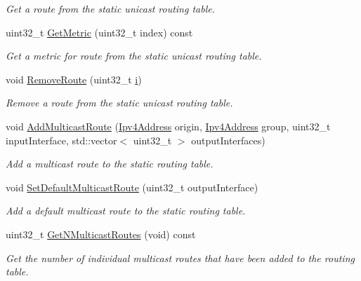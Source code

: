 \begin{DoxyCompactItemize}
\begin{DoxyCompactList}\small\item\em Get a route from the static unicast routing table. \end{DoxyCompactList}\item 
uint32\+\_\+t \hyperlink{classns3_1_1Ipv4StaticRouting_adae3d8690cec2cac5f5c4e2b239feb17}{Get\+Metric} (uint32\+\_\+t index) const 
\begin{DoxyCompactList}\small\item\em Get a metric for route from the static unicast routing table. \end{DoxyCompactList}\item 
void \hyperlink{classns3_1_1Ipv4StaticRouting_a2814791ae24de098c228d8ec64278444}{Remove\+Route} (uint32\+\_\+t \hyperlink{lte__uplink__power__control_8m_a6f6ccfcf58b31cb6412107d9d5281426}{i})
\begin{DoxyCompactList}\small\item\em Remove a route from the static unicast routing table. \end{DoxyCompactList}\item 
void \hyperlink{classns3_1_1Ipv4StaticRouting_a58582a0b87b6705d3c974146a19e25b9}{Add\+Multicast\+Route} (\hyperlink{classns3_1_1Ipv4Address}{Ipv4\+Address} origin, \hyperlink{classns3_1_1Ipv4Address}{Ipv4\+Address} group, uint32\+\_\+t input\+Interface, std\+::vector$<$ uint32\+\_\+t $>$ output\+Interfaces)
\begin{DoxyCompactList}\small\item\em Add a multicast route to the static routing table. \end{DoxyCompactList}\item 
void \hyperlink{classns3_1_1Ipv4StaticRouting_a478128042db3170f6419f86f1a9e5ecf}{Set\+Default\+Multicast\+Route} (uint32\+\_\+t output\+Interface)
\begin{DoxyCompactList}\small\item\em Add a default multicast route to the static routing table. \end{DoxyCompactList}\item 
uint32\+\_\+t \hyperlink{classns3_1_1Ipv4StaticRouting_a12d3044b0fa28e961e7705ae26387bc9}{Get\+N\+Multicast\+Routes} (void) const 
\begin{DoxyCompactList}\small\item\em Get the number of individual multicast routes that have been added to the routing table. \end{DoxyCompactList}\item 

\end{DoxyCompactItemize}
